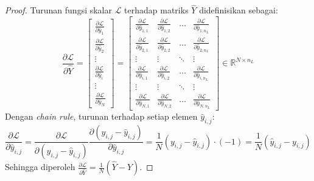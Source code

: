 \documentclass[11pt,a4paper]{article}
\def\mathbf#1{#1}%
\theoremstyle{plain}
\theoremstyle{definition}
\theoremstyle{remark}
\begin{document}
\begin{proof}
Turunan fungsi skalar $\mathcal{L}$ terhadap matriks $\hat{Y}$ didefinisikan sebagai:
\begin{equation}
    \frac{\partial \mathcal{L}}{\partial \hat{Y}} = \begin{bmatrix}
        \frac{\partial \mathcal{L}}{\partial \hat{\mathbf{y}}_1} \\
        \frac{\partial \mathcal{L}}{\partial \hat{\mathbf{y}}_2} \\
        \vdots \\
        \frac{\partial \mathcal{L}}{\partial \hat{\mathbf{y}}_i} \\
        \vdots \\
        \frac{\partial \mathcal{L}}{\partial \hat{\mathbf{y}}_N}
    \end{bmatrix} = \begin{bmatrix}
        \frac{\partial \mathcal{L}}{\partial \hat{y}_{1, 1}} & \frac{\partial \mathcal{L}}{\partial \hat{y}_{1, 2}} & \dots & \frac{\partial \mathcal{L}}{\partial \hat{y}_{1, n_L}} \\
        \frac{\partial \mathcal{L}}{\partial \hat{y}_{2, 1}} & \frac{\partial \mathcal{L}}{\partial \hat{y}_{2, 2}} & \dots & \frac{\partial \mathcal{L}}{\partial \hat{y}_{2, n_L}} \\
        \vdots & \vdots & \ddots & \vdots \\
        \frac{\partial \mathcal{L}}{\partial \hat{y}_{i, 1}} & \frac{\partial \mathcal{L}}{\partial \hat{y}_{i, 2}} & \dots & \frac{\partial \mathcal{L}}{\partial \hat{y}_{i, n_L}} \\
        \vdots & \vdots & \ddots & \vdots \\
        \frac{\partial \mathcal{L}}{\partial \hat{y}_{N, 1}} & \frac{\partial \mathcal{L}}{\partial \hat{y}_{N, 2}} & \dots & \frac{\partial \mathcal{L}}{\partial \hat{y}_{N, n_L}}
    \end{bmatrix} \in \mathbb{R}^{N \times n_L}
\end{equation}
Dengan \textit{chain rule}, turunan terhadap setiap elemen $\hat{y}_{i, j}$:
\begin{equation}
    \frac{\partial \mathcal{L}}{\partial \hat{y}_{i, j}} = \frac{\partial \mathcal{L}}{\partial (y_{i, j} - \hat{y}_{i, j})} \frac{\partial (y_{i, j} - \hat{y}_{i, j})}{\partial \hat{y}_{i, j}} = \frac{1}{N} (y_{i, j} - \hat{y}_{i, j}) \cdot (-1) = \frac{1}{N} (\hat{y}_{i, j} - y_{i, j})
\end{equation}
Sehingga diperoleh $\frac{\partial \mathcal{L}}{\partial \hat{Y}} = \frac{1}{N} (\hat{Y} - Y)$.
\end{proof}
\end{document}
